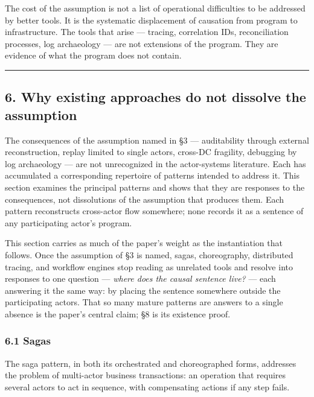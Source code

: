 \documentclass[
]{article}
\newcounter{none} %
\begin{document}
The cost of the assumption is not a list of operational difficulties to
be addressed by better tools. It is the systematic displacement of
causation from program to infrastructure. The tools that arise ---
tracing, correlation IDs, reconciliation processes, log archaeology ---
are not extensions of the program. They are evidence of what the program
does not contain.

\begin{center}\rule{0.5\linewidth}{0.5pt}\end{center}

\subsection{6. Why existing approaches do not dissolve the
assumption}\label{why-existing-approaches-do-not-dissolve-the-assumption}

The consequences of the assumption named in §3 --- auditability through
external reconstruction, replay limited to single actors, cross-DC
fragility, debugging by log archaeology --- are not unrecognized in the
actor-systems literature. Each has accumulated a corresponding
repertoire of patterns intended to address it. This section examines the
principal patterns and shows that they are responses to the
consequences, not dissolutions of the assumption that produces them.
Each pattern reconstructs cross-actor flow somewhere; none records it as
a sentence of any participating actor's program.

This section carries as much of the paper's weight as the instantiation
that follows. Once the assumption of §3 is named, sagas, choreography,
distributed tracing, and workflow engines stop reading as unrelated
tools and resolve into responses to one question --- \emph{where does
the causal sentence live?} --- each answering it the same way: by
placing the sentence somewhere outside the participating actors. That so
many mature patterns are answers to a single absence is the paper's
central claim; §8 is its existence proof.

\subsubsection{6.1 Sagas}\label{sagas}

The saga pattern, in both its orchestrated and choreographed forms,
addresses the problem of multi-actor business transactions: an operation
that requires several actors to act in sequence, with compensating
actions if any step fails.
\end{document}
